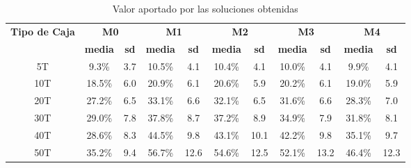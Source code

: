 \begin{table}[H]
    \centering
    \caption{Valor aportado por las soluciones obtenidas}
    \label{tab:valor_aportado}
    \begin{tabular}{|c|c|c|c|c|c|c|c|c|c|c|}
        \hline
        \multirow{2}{*}{\textbf{Tipo de Caja}} & \multicolumn{2}{c|}{\textbf{M0}} & \multicolumn{2}{c|}{\textbf{M1}} & \multicolumn{2}{c|}{\textbf{M2}} & \multicolumn{2}{c|}{\textbf{M3}} & \multicolumn{2}{c|}{\textbf{M4}}                                                                             \\ \cline{2-11}
                                               & \textbf{media}                   & \textbf{sd}                      & \textbf{media}                   & \textbf{sd}                      & \textbf{media}                   & \textbf{sd} & \textbf{media} & \textbf{sd} & \textbf{media} & \textbf{sd} \\ \hline
        5T                                     & 9.3\%                            & 3.7                              & 10.5\%                           & 4.1                              & 10.4\%                           & 4.1         & 10.0\%         & 4.1         & 9.9\%          & 4.1         \\ \hline
        10T                                    & 18.5\%                           & 6.0                              & 20.9\%                           & 6.1                              & 20.6\%                           & 5.9         & 20.2\%         & 6.1         & 19.0\%         & 5.9         \\ \hline
        20T                                    & 27.2\%                           & 6.5                              & 33.1\%                           & 6.6                              & 32.1\%                           & 6.5         & 31.6\%         & 6.6         & 28.3\%         & 7.0         \\ \hline
        30T                                    & 29.0\%                           & 7.8                              & 37.8\%                           & 8.7                              & 37.2\%                           & 8.9         & 34.9\%         & 7.9         & 31.8\%         & 8.1         \\ \hline
        40T                                    & 28.6\%                           & 8.3                              & 44.5\%                           & 9.8                              & 43.1\%                           & 10.1        & 42.2\%         & 9.8         & 35.1\%         & 9.7         \\ \hline
        50T                                    & 35.2\%                           & 9.4                              & 56.7\%                           & 12.6                             & 54.6\%                           & 12.5        & 52.1\%         & 13.2        & 46.4\%         & 12.3        \\ \hline
    \end{tabular}
\end{table}

